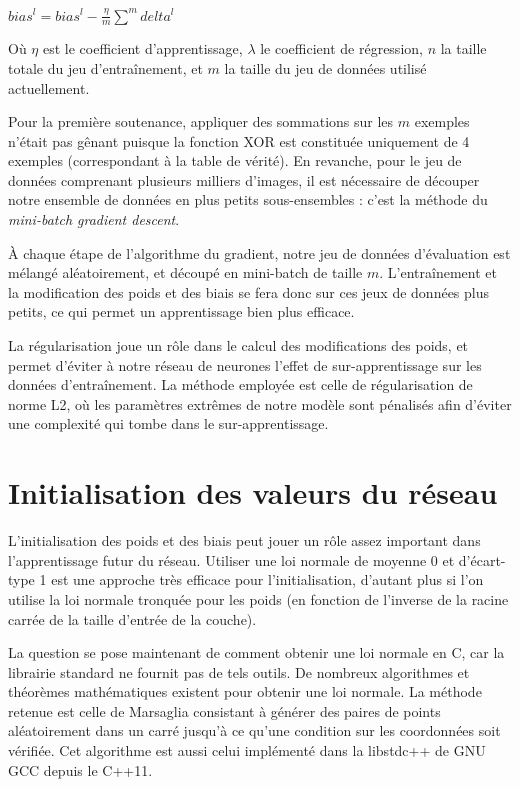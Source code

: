 $bias^l = bias^l - \frac{\eta}{m} \displaystyle\sum^m{delta^l}$

Où $\eta$ est le coefficient d'apprentissage, $\lambda$ le coefficient de
régression, $n$ la taille totale du jeu d'entraînement, et $m$ la taille du jeu
de données utilisé actuellement.

Pour la première soutenance, appliquer des sommations sur les $m$ exemples
n'était pas gênant puisque la fonction XOR est constituée uniquement de 4
exemples (correspondant à la table de vérité). En revanche, pour le jeu de
données comprenant plusieurs milliers d'images, il est nécessaire de découper
notre ensemble de données en plus petits sous-ensembles : c'est la méthode du
\textit{mini-batch gradient descent}.

À chaque étape de l'algorithme du gradient, notre jeu de données d'évaluation
est mélangé aléatoirement, et découpé en mini-batch de taille $m$.
L'entraînement et la modification des poids et des biais se fera donc sur ces
jeux de données plus petits, ce qui permet un apprentissage bien plus efficace.

La régularisation joue un rôle dans le calcul des modifications des poids, et
permet d'éviter à notre réseau de neurones l'effet de sur-apprentissage sur les
données d'entraînement. La méthode employée est celle de régularisation de
norme L2, où les paramètres extrêmes de notre modèle sont pénalisés afin
d'éviter une complexité qui tombe dans le sur-apprentissage.

\newpage

\section{Initialisation des valeurs du réseau}

L'initialisation des poids et des biais peut jouer un rôle assez important dans
l'apprentissage futur du réseau. Utiliser une loi normale de moyenne 0 et
d'écart-type 1 est une approche très efficace pour l'initialisation, d'autant
plus si l'on utilise la loi normale tronquée pour les poids (en fonction de
l'inverse de la racine carrée de la taille d'entrée de la couche).

La question se pose maintenant de comment obtenir une loi normale en C, car la
librairie standard ne fournit pas de tels outils. De nombreux algorithmes et
théorèmes mathématiques existent pour obtenir une loi normale. La méthode
retenue est celle de Marsaglia consistant à générer des paires de points
aléatoirement dans un carré jusqu'à ce qu'une condition sur les coordonnées soit
vérifiée. Cet algorithme est aussi celui implémenté dans la libstdc++ de GNU GCC
depuis le C++11.

